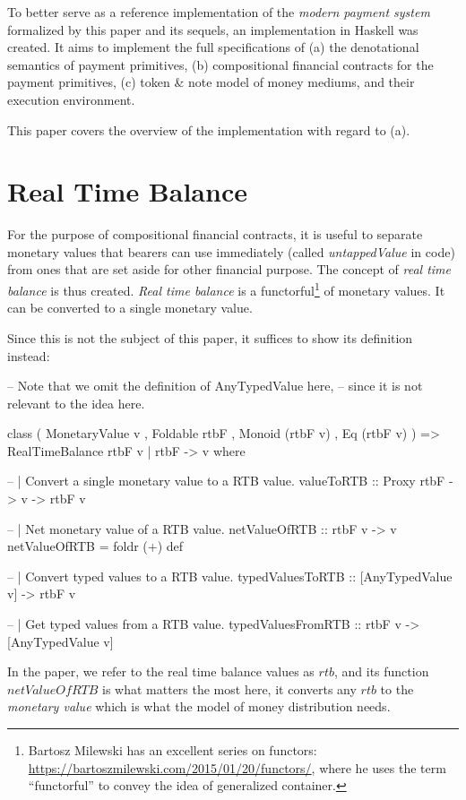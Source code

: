 To better serve as a reference implementation of the \textit{modern payment system} formalized by
this paper and its sequels, an implementation in Haskell was created. It aims to implement the full
specifications of (a) the denotational semantics of payment primitives, (b) compositional financial
contracts for the payment primitives, (c) token \& note model of money mediums, and their execution
environment.

This paper covers the overview of the implementation with regard to (a).

\section{Real Time Balance}

For the purpose of compositional financial contracts, it is useful to separate monetary values that
bearers can use immediately (called \textit{untappedValue} in code) from ones that are set aside for
other financial purpose. The concept of \textit{real time balance} is thus created. \textit{Real
time balance} is a functorful\footnote{Bartosz Milewski has an excellent series on
functors: \url{https://bartoszmilewski.com/2015/01/20/functors/}, where he uses the term
``functorful'' to convey the idea of generalized container.} of monetary values. It can be converted
to a single monetary value.

Since this is not the subject of this paper, it suffices to show its definition instead:

\begin{code}
-- Note that we omit the definition of AnyTypedValue here,
-- since it is not relevant to the idea here.

class ( MonetaryValue v
      , Foldable rtbF
      , Monoid (rtbF v)
      , Eq (rtbF v)
      ) => RealTimeBalance rtbF v | rtbF -> v where

    -- | Convert a single monetary value to a RTB value.
    valueToRTB :: Proxy rtbF -> v -> rtbF v

    -- | Net monetary value of a RTB value.
    netValueOfRTB :: rtbF v -> v
    netValueOfRTB = foldr (+) def

    -- | Convert typed values to a RTB value.
    typedValuesToRTB :: [AnyTypedValue v] -> rtbF v

    -- | Get typed values from a RTB value.
    typedValuesFromRTB :: rtbF v -> [AnyTypedValue v]
\end{code}

In the paper, we refer to the real time balance values as $rtb$, and its function $netValueOfRTB$ is
what matters the most here, it converts any $rtb$ to the \textit{monetary value} which is what the
model of money distribution needs.

